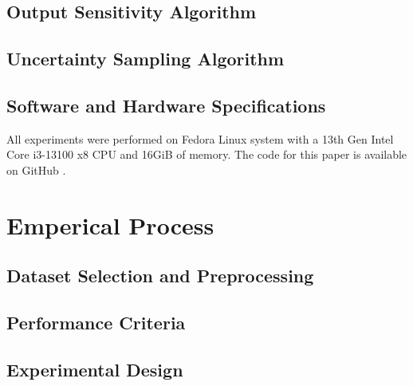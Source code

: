 \documentclass[10pt, conference]{IEEEtran}
\begin{document}
\subsection{Output Sensitivity Algorithm}

\subsection{Uncertainty Sampling Algorithm}

\subsection{Software and Hardware Specifications}
All experiments were performed on Fedora Linux system with a 13th Gen Intel Core i3-13100 x8 CPU and 16GiB of memory. The code for this paper is available on GitHub \cite{github}.



\section{Emperical Process}
\subsection{Dataset Selection and Preprocessing}

\subsection{Performance Criteria}

\subsection{Experimental Design}
\end{document}
